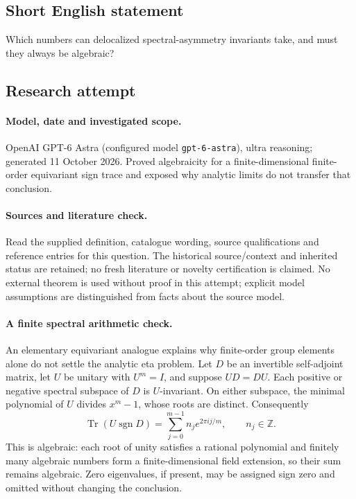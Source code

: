 \documentclass[11pt]{article}
\begin{document}
\subsection{Short English statement}
Which numbers can delocalized spectral-asymmetry invariants take, and must they always be algebraic?
\subsection{Research attempt}
\paragraph{Model, date and investigated scope.}
OpenAI GPT-6 Astra (configured model \texttt{gpt-6-astra}), ultra reasoning; generated 11 October 2026. Proved algebraicity for a finite-dimensional finite-order equivariant sign trace and exposed why analytic limits do not transfer that conclusion.

\paragraph{Sources and literature check.}
Read the supplied definition, catalogue wording, source qualifications and reference entries for this question. The historical source/context and inherited status are retained; no fresh literature or novelty certification is claimed. No external theorem is used without proof in this attempt; explicit model assumptions are distinguished from facts about the source model.

\paragraph{A finite spectral arithmetic check.} An elementary equivariant analogue explains why finite-order group elements alone do not settle the analytic eta problem. Let \(D\) be an invertible self-adjoint matrix, let \(U\) be unitary with \(U^m=I\), and suppose \(UD=DU\). Each positive or negative spectral subspace of \(D\) is \(U\)-invariant. On either subspace, the minimal polynomial of \(U\) divides \(x^m-1\), whose roots are distinct. Consequently
\[
 \operatorname{Tr}(U\operatorname{sgn}D)=\sum_{j=0}^{m-1}n_j e^{2\pi i j/m},\qquad n_j\in\mathbb Z.
\]
This is algebraic: each root of unity satisfies a rational polynomial and finitely many algebraic numbers form a finite-dimensional field extension, so their sum remains algebraic. Zero eigenvalues, if present, may be assigned sign zero and omitted without changing the conclusion.
\end{document}
